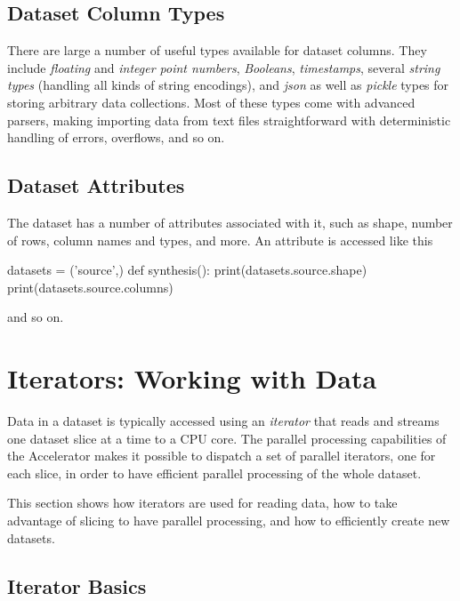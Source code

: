 \subsection{Dataset Column Types}

There are large a number of useful types available for dataset
columns.  They include \textsl{floating} and \textsl{integer point
  numbers}, \textsl{Booleans}, \textsl{timestamps}, several
\textsl{string types} (handling all kinds of string encodings), and
\textsl{json} as well as \textsl{pickle} types for storing arbitrary
data collections.  Most of these types come with advanced parsers,
making importing data from text files straightforward with
deterministic handling of errors, overflows, and so on.



\subsection{Dataset Attributes}
The dataset has a number of attributes associated with it, such as
shape, number of rows, column names and types, and more.
An attribute is accessed like this
\begin{python}
datasets = ('source',)
def synthesis():
    print(datasets.source.shape)
    print(datasets.source.columns)
\end{python}
and so on.



\section{Iterators: Working with Data}

Data in a dataset is typically accessed using an \emph{iterator} that
reads and streams one dataset slice at a time to a CPU core.  The
parallel processing capabilities of the Accelerator makes it possible
to dispatch a set of parallel iterators, one for each slice, in order
to have efficient parallel processing of the whole dataset.

This section shows how iterators are used for reading data, how to
take advantage of slicing to have parallel processing, and how to
efficiently create new datasets.


\subsection{Iterator Basics}

